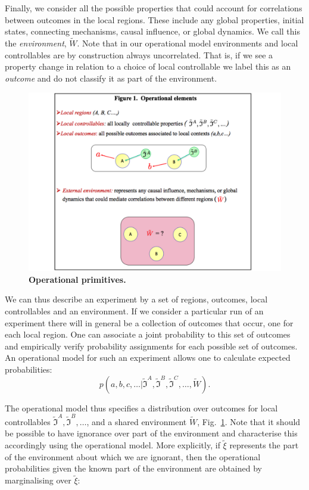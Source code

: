 \documentclass[a4paper,onecolumn,11pt,accepted=2018-05-04]{quantumarticle}
\begin{document}
Finally, we consider all the possible properties that could account for correlations between outcomes in the local regions. These include any global properties, initial states, connecting mechanisms, causal influence, or global dynamics. We call this the \emph{environment}, $\tilde{W}$. Note that in our operational model environments and local controllables are by construction always uncorrelated. That is, if we see a property change in relation to a choice of local controllable we label this as an \emph{outcome} and do not classify it as part of the environment. 
\begin{figure}[ht]%
\centering
\includegraphics[width=0.7\columnwidth]{figure1}%
\caption{\textbf{Operational primitives.}}%
\label{region}%
\end{figure}

We can thus describe an experiment by a set of regions, outcomes, local controllables and an environment. If we consider a particular run of an experiment there will in general be a collection of outcomes that occur, one for each local region. One can associate a joint probability to this set of outcomes and empirically verify probability assignments for each possible set of outcomes. An operational model for such an experiment allows one to calculate expected probabilities: 
\begin{equation}
p(a, b, c,\dots| \tilde{\mathcal{\mathfrak{I}}}^A, \tilde{\mathcal{\mathfrak{I}}}^B, \tilde{\mathcal{\mathfrak{I}}}^C,\dots, \tilde{W}).
\end{equation}

The operational model thus specifies a distribution over outcomes for local controllables  $\tilde{\mathcal{\mathfrak{I}}}^A, \tilde{\mathcal{\mathfrak{I}}}^B, \dots$, and a shared environment $\tilde{W}$, Fig.~\ref{region}. Note that it should be possible to have ignorance over part of the environment and characterise this accordingly using the operational model. More explicitly, if $\tilde{\xi}$ represents the part of the environment about which we are ignorant, then the operational probabilities given the known part of the environment are obtained by marginalising over $\tilde{\xi}$:
\end{document}

